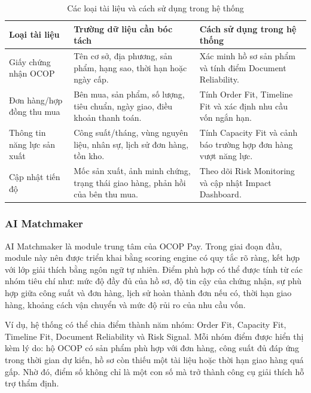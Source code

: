 \documentclass[13pt,a4paper]{extarticle}
\begin{document}
\begin{table}[H]
\centering
\caption{Các loại tài liệu và cách sử dụng trong hệ thống}
\begin{tabular}{|p{3.5cm}|p{5cm}|p{5cm}|}
\hline
\textbf{Loại tài liệu} & \textbf{Trường dữ liệu cần bóc tách} & \textbf{Cách sử dụng trong hệ thống} \\
\hline
Giấy chứng nhận OCOP & Tên cơ sở, địa phương, sản phẩm, hạng sao, thời hạn hoặc ngày cấp. & Xác minh hồ sơ sản phẩm và tính điểm Document Reliability. \\
\hline
Đơn hàng/hợp đồng thu mua & Bên mua, sản phẩm, số lượng, tiêu chuẩn, ngày giao, điều khoản thanh toán. & Tính Order Fit, Timeline Fit và xác định nhu cầu vốn ngắn hạn. \\
\hline
Thông tin năng lực sản xuất & Công suất/tháng, vùng nguyên liệu, nhân sự, lịch sử đơn hàng, tồn kho. & Tính Capacity Fit và cảnh báo trường hợp đơn hàng vượt năng lực. \\
\hline
Cập nhật tiến độ & Mốc sản xuất, ảnh minh chứng, trạng thái giao hàng, phản hồi của bên thu mua. & Theo dõi Risk Monitoring và cập nhật Impact Dashboard. \\
\hline
\end{tabular}
\end{table}

\subsubsection{AI Matchmaker}

AI Matchmaker là module trung tâm của OCOP Pay. Trong giai đoạn đầu, module này nên được triển khai bằng scoring engine có quy tắc rõ ràng, kết hợp với lớp giải thích bằng ngôn ngữ tự nhiên. Điểm phù hợp có thể được tính từ các nhóm tiêu chí như: mức độ đầy đủ của hồ sơ, độ tin cậy của chứng nhận, sự phù hợp giữa công suất và đơn hàng, lịch sử hoàn thành đơn nếu có, thời hạn giao hàng, khoảng cách vận chuyển và mức độ rủi ro của nhu cầu vốn.

Ví dụ, hệ thống có thể chia điểm thành năm nhóm: Order Fit, Capacity Fit, Timeline Fit, Document Reliability và Risk Signal. Mỗi nhóm điểm được hiển thị kèm lý do: hộ OCOP có sản phẩm phù hợp với đơn hàng, công suất đủ đáp ứng trong thời gian dự kiến, hồ sơ còn thiếu một tài liệu hoặc thời hạn giao hàng quá gấp. Nhờ đó, điểm số không chỉ là một con số mà trở thành công cụ giải thích hỗ trợ thẩm định.
\end{document}

